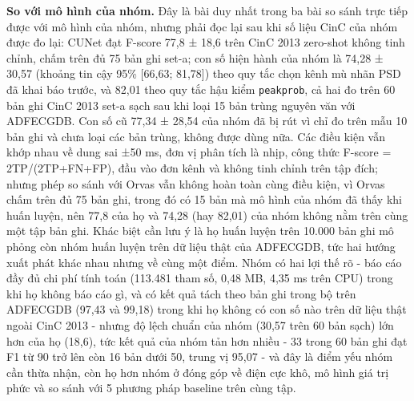 \documentclass[12pt,a4paper]{article}
\begin{document}
\noindent \textbf{\color{tdtblue}So với mô hình của nhóm.} Đây là bài duy nhất trong ba bài so sánh trực tiếp được với mô hình của nhóm, nhưng phải đọc lại sau khi số liệu CinC của nhóm được đo lại: CUNet đạt F-score 77,8 ± 18,6 trên CinC 2013 zero-shot không tinh chỉnh, chấm trên đủ 75 bản ghi set-a; con số hiện hành của nhóm là 74,28 ± 30,57 (khoảng tin cậy 95\% [66,63; 81,78]) theo quy tắc chọn kênh mù nhãn PSD đã khai báo trước, và 82,01 theo quy tắc hậu kiểm \texttt{peakprob}, cả hai đo trên 60 bản ghi CinC 2013 set-a sạch sau khi loại 15 bản trùng nguyên văn với ADFECGDB. Con số cũ 77,34 ± 28,54 của nhóm đã bị rút vì chỉ đo trên mẫu 10 bản ghi và chưa loại các bản trùng, không được dùng nữa. Các điều kiện vẫn khớp nhau về dung sai ±50 ms, đơn vị phân tích là nhịp, công thức F-score = 2TP/(2TP+FN+FP), đầu vào đơn kênh và không tinh chỉnh trên tập đích; nhưng phép so sánh với Orvas vẫn không hoàn toàn cùng điều kiện, vì Orvas chấm trên đủ 75 bản ghi, trong đó có 15 bản mà mô hình của nhóm đã thấy khi huấn luyện, nên 77,8 của họ và 74,28 (hay 82,01) của nhóm không nằm trên cùng một tập bản ghi. Khác biệt cần lưu ý là họ huấn luyện trên 10.000 bản ghi mô phỏng còn nhóm huấn luyện trên dữ liệu thật của ADFECGDB, tức hai hướng xuất phát khác nhau nhưng về cùng một điểm. Nhóm có hai lợi thế rõ - báo cáo đầy đủ chi phí tính toán (113.481 tham số, 0,48 MB, 4,35 ms trên CPU) trong khi họ không báo cáo gì, và có kết quả tách theo bản ghi trong bộ trên ADFECGDB (97,43 và 99,18) trong khi họ không có con số nào trên dữ liệu thật ngoài CinC 2013 - nhưng độ lệch chuẩn của nhóm (30,57 trên 60 bản sạch) lớn hơn của họ (18,6), tức kết quả của nhóm tản hơn nhiều - 33 trong 60 bản ghi đạt F1 từ 90 trở lên còn 16 bản dưới 50, trung vị 95,07 - và đây là điểm yếu nhóm cần thừa nhận, còn họ hơn nhóm ở đóng góp về điện cực khô, mô hình giá trị phức và so sánh với 5 phương pháp baseline trên cùng tập.\par\vspace{3pt}
\end{document}
